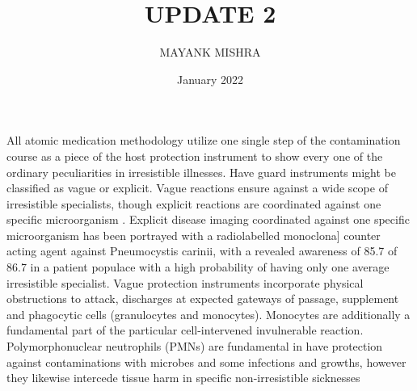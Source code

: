 \documentclass{article}
\title{UPDATE 2}
\author{MAYANK MISHRA}
\date{January 2022}
\begin{document}
\maketitle

\section{}
All atomic medication methodology utilize one single step of
the contamination course as a piece of the host protection instrument to show every one of the ordinary peculiarities in irresistible illnesses. Have guard instruments might be classified as vague or explicit. Vague reactions
ensure against a wide scope of irresistible specialists, though explicit reactions are coordinated against one specific
microorganism .
Explicit disease imaging coordinated against one specific microorganism has been portrayed with a radiolabelled monoclona] counter acting agent against Pneumocystis carinii, with a revealed awareness of 85.7%
of 86.7%
in a patient populace with a high probability of having
only one average irresistible specialist.
Vague protection instruments incorporate physical
obstructions to attack, discharges at expected gateways of passage, supplement and phagocytic cells (granulocytes and
monocytes). Monocytes are additionally a fundamental part
of the particular cell-intervened invulnerable reaction. Polymorphonuclear neutrophils (PMNs) are fundamental in have
protection against contaminations with microbes and some infections and growths, however they likewise intercede tissue harm in specific non-irresistible sicknesses
\end{document}
